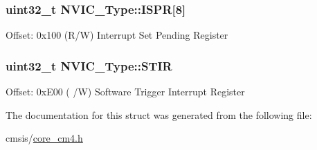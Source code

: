 \subsubsection[{\texorpdfstring{I\+S\+PR}{ISPR}}]{ uint32\+\_\+t N\+V\+I\+C\+\_\+\+Type\+::\+I\+S\+PR\mbox{[}8\mbox{]}}\hypertarget{struct_n_v_i_c___type_acf8e38fc2e97316242ddeb7ea959ab90}{}\label{struct_n_v_i_c___type_acf8e38fc2e97316242ddeb7ea959ab90}
Offset\+: 0x100 (R/W) Interrupt Set Pending Register 
\subsubsection[{\texorpdfstring{S\+T\+IR}{STIR}}]{ uint32\+\_\+t N\+V\+I\+C\+\_\+\+Type\+::\+S\+T\+IR}\hypertarget{struct_n_v_i_c___type_a0b0d7f3131da89c659a2580249432749}{}\label{struct_n_v_i_c___type_a0b0d7f3131da89c659a2580249432749}
Offset\+: 0x\+E00 ( /W) Software Trigger Interrupt Register 

The documentation for this struct was generated from the following file\+:\begin{DoxyCompactItemize}
\item 
cmsis/\hyperlink{core__cm4_8h}{core\+\_\+cm4.\+h}\end{DoxyCompactItemize}
